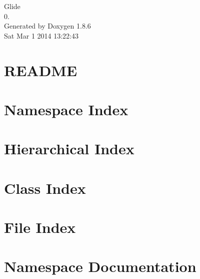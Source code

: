 \documentclass[twoside]{book}
\newcommand{\clearemptydoublepage}{%
  \newpage{\pagestyle{empty}\cleardoublepage}%
}
\begin{document}
\hypersetup{pageanchor=false}
\begin{titlepage}
\vspace*{7cm}
\begin{center}%
{\Large Glide \\[1ex]\large 0. }\\
\vspace*{1cm}
{\large Generated by Doxygen 1.8.6}\\
\vspace*{0.5cm}
{\small Sat Mar 1 2014 13:22:43}\\
\end{center}
\end{titlepage}
\clearemptydoublepage
\tableofcontents
\clearemptydoublepage
{}
\hypersetup{pageanchor=true}

\chapter{R\-E\-A\-D\-M\-E}
\label{md__r_e_a_d_m_e}
\hypertarget{md__r_e_a_d_m_e}{}

\chapter{Namespace Index}

\chapter{Hierarchical Index}

\chapter{Class Index}

\chapter{File Index}

\chapter{Namespace Documentation}



\end{document}
